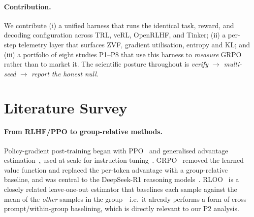 \documentclass[11pt,a4paper]{article}
\begin{document}
\paragraph{Contribution.}
We contribute (i) a unified harness that runs the identical task, reward, and
decoding configuration across TRL, veRL, OpenRLHF, and Tinker; (ii) a per-step telemetry layer that
surfaces ZVF, gradient utilisation, entropy and KL; and (iii) a portfolio of
eight studies P1--P8 that use this harness to \emph{measure} GRPO rather than to
market it. The scientific posture throughout is \emph{verify $\rightarrow$
multi-seed $\rightarrow$ report the honest null}.

\section{Literature Survey}
\label{sec:lit}

\paragraph{From RLHF/PPO to group-relative methods.}
Policy-gradient post-training began with PPO~\cite{schulman2017ppo} and
generalised advantage estimation~\cite{schulman2015gae}, used at scale for
instruction tuning~\cite{ouyang2022instructgpt}. GRPO~\cite{shao2024deepseekmath}
removed the learned value function and replaced the per-token advantage with a
group-relative baseline, and was central to the DeepSeek-R1 reasoning
models~\cite{guo2025r1}. RLOO~\cite{ahmadian2024rloo} is a closely related
leave-one-out estimator that baselines each sample against the mean of the
\emph{other} samples in the group---i.e.\ it already performs a form of
cross-prompt/within-group baselining, which is directly relevant to our P2
analysis.
\end{document}

